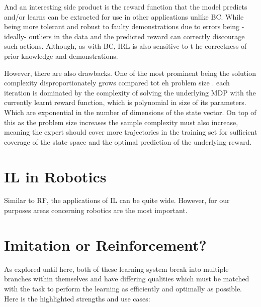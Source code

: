 And an interesting side product is the reward function that the model predicts and/or learns can be extracted for use in other applications unlike BC. While being more tolerant and robust to faulty demonstrations due to errors being -ideally- outliers in the data and the predicted reward can correctly discourage such actions. Although, as with BC, IRL is also sensitive to t he correctness of prior knowledge and demonstrations.


However, there are also drawbacks. One of the most prominent being the solution complexity disproportionately grows compared tot eh problem size \cite{ARORA2021103500}. each iteration is dominated by the complexity of solving the underlying MDP with the currently learnt reward function, which is polynomial in size of its parameters. Which are exponential in the number of dimensions of the state vector. On top of this as the problem size increases the sample complexity must also increase, meaning the expert should cover more trajectories in the training set for sufficient coverage of the state space and the optimal prediction of the underlying reward.


\section{IL in Robotics}
Similar to RF, the applications of IL can be quite wide. However, for our purposes areas concerning robotics are the most important.


\section{Imitation or Reinforcement?}
As explored until here, both of these learning system break into multiple branches within themselves and have differing qualities which must be matched with the task to perform the learning as efficiently and optimally as possible. Here is the highlighted strengths and use cases:

